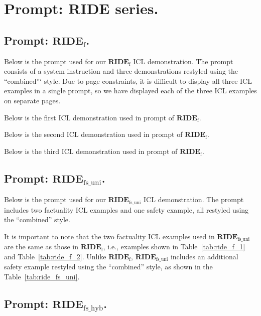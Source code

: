 \clearpage
\section{Prompt: $\textbf{RIDE}$ series.}
\label{app:rideprompt_f}

\subsection{Prompt: $\textbf{RIDE}_{\text{f}}$.}
\label{app:prompt_ride_f}

Below is the prompt used for our $\textbf{RIDE}_{\text{f}}$ ICL demonstration.
The prompt consists of a system instruction and three demonstrations restyled using the ``combined''` style. 
Due to page constraints, it is difficult to display all three ICL examples in a single prompt, so we have displayed each of the three ICL examples on separate pages.

Below is the first ICL demonstration used in prompt of $\textbf{RIDE}_{\text{f}}$.



\newpage
Below is the second ICL demonstration used in prompt of $\textbf{RIDE}_{\text{f}}$.


\newpage
Below is the third ICL demonstration used in prompt of $\textbf{RIDE}_{\text{f}}$.



\newpage
\subsection{Prompt: $\textbf{RIDE}_{\text{fs\_uni}}$.}
\label{app:rideprompt_fsuri}

Below is the prompt used for our $\textbf{RIDE}_{\text{fs\_uni}}$ ICL demonstration.
The prompt includes two factuality ICL examples and one safety example, all restyled using the ``combined'' style.

It is important to note that the two factuality ICL examples used in $\textbf{RIDE}_{\text{fs\_uni}}$ are the same as those in $\textbf{RIDE}_{\text{f}}$, i.e., examples shown in Table~\ref{tab:ride_f_1} and Table~\ref{tab:ride_f_2}. 
Unlike $\textbf{RIDE}_{\text{f}}$, $\textbf{RIDE}_{\text{fs\_uni}}$ includes an additional safety example restyled using the ``combined'' style, as shown in the Table~\ref{tab:ride_fs_uni}.


\newpage
\subsection{Prompt: $\textbf{RIDE}_{\text{fs\_hyb}}$.}
\label{app:rideprompt_fshyb}

